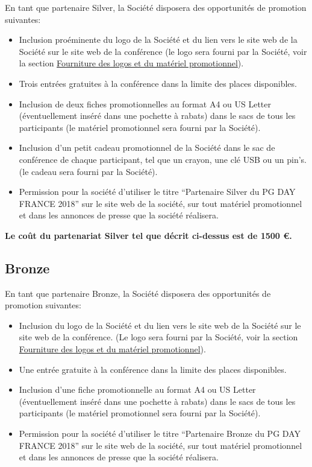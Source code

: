 \documentclass[]{article}
\providecommand{\tightlist}{%
  \setlength{\itemsep}{0pt}\setlength{\parskip}{0pt}}
\begin{document}
En tant que partenaire Silver, la Société disposera des opportunités de
promotion suivantes:\\

\begin{itemize}
\tightlist
\item
  Inclusion proéminente du logo de la Société et du lien vers le site
  web de la Société sur le site web de la conférence (le logo sera
  fourni par la Société, voir la section
  \protect\hyperlink{fourniture-des-logos-et-du-matuxe9riel-promotionnel}{Fourniture
  des logos et du matériel promotionnel}).
\item
  Trois entrées gratuites à la conférence dans la limite des places
  disponibles.
\item
  Inclusion de deux fiches promotionnelles au format A4 ou US Letter
  (éventuellement inséré dans une pochette à rabats) dans le sacs de
  tous les participants (le matériel promotionnel sera fourni par la
  Société).
\item
  Inclusion d'un petit cadeau promotionnel de la Société dans le sac de
  conférence de chaque participant, tel que un crayon, une clé USB ou un
  pin's. (le cadeau sera fourni par la Société).
\item
  Permission pour la société d'utiliser le titre ``Partenaire Silver du
  PG DAY FRANCE 2018'' sur le site web de la société, sur tout matériel
  promotionnel et dans les annonces de presse que la société réalisera.
\end{itemize}

\textbf{Le coût du partenariat Silver tel que décrit ci-dessus est de
1500 €.}

\hypertarget{bronze}{%
\subsection{Bronze}\label{bronze}}

En tant que partenaire Bronze, la Société disposera des opportunités de
promotion suivantes:

\begin{itemize}
\tightlist
\item
  Inclusion du logo de la Société et du lien vers le site web de la
  Société sur le site web de la conférence. (Le logo sera fourni par la
  Société, voir la section
  \protect\hyperlink{fourniture-des-logos-et-du-matuxe9riel-promotionnel}{Fourniture
  des logos et du matériel promotionnel}).
\item
  Une entrée gratuite à la conférence dans la limite des places
  disponibles.
\item
  Inclusion d'une fiche promotionnelle au format A4 ou US Letter
  (éventuellement inséré dans une pochette à rabats) dans le sacs de
  tous les participants (le matériel promotionnel sera fourni par la
  Société).
\item
  Permission pour la société d'utiliser le titre ``Partenaire Bronze du
  PG DAY FRANCE 2018'' sur le site web de la société, sur tout matériel
  promotionnel et dans les annonces de presse que la société réalisera.
\end{itemize}
\end{document}
